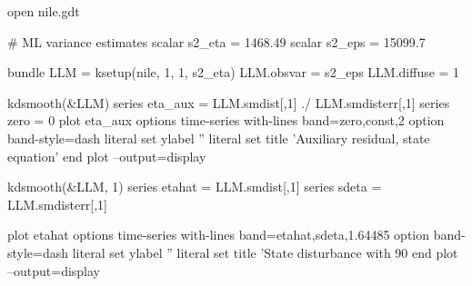 \begin{script}[htbp]
  \label{script:auxres}
\begin{scode}
open nile.gdt

# ML variance estimates
scalar s2_eta = 1468.49
scalar s2_eps = 15099.7

bundle LLM = ksetup(nile, 1, 1, s2_eta)
LLM.obsvar = s2_eps
LLM.diffuse = 1

kdsmooth(&LLM)
series eta_aux = LLM.smdist[,1] ./ LLM.smdisterr[,1]
series zero = 0
plot eta_aux
    options time-series with-lines band=zero,const,2
    option band-style=dash
    literal set ylabel ''
    literal set title 'Auxiliary residual, state equation'
end plot --output=display

kdsmooth(&LLM, 1)
series etahat = LLM.smdist[,1]
series sdeta = LLM.smdisterr[,1]

plot etahat
    options time-series with-lines band=etahat,sdeta,1.64485
    option band-style=dash
    literal set ylabel ''
    literal set title 'State disturbance with 90%
end plot --output=display
\end{scode}
\end{script}


